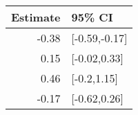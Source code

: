 \begin{tabular}{rl}
  \hline
Estimate & 95\% CI \\ 
  \hline
-0.38 & [-0.59,-0.17] \\ 
  0.15 & [-0.02,0.33] \\ 
  0.46 & [-0.2,1.15] \\ 
  -0.17 & [-0.62,0.26] \\ 
   \hline
\end{tabular}

